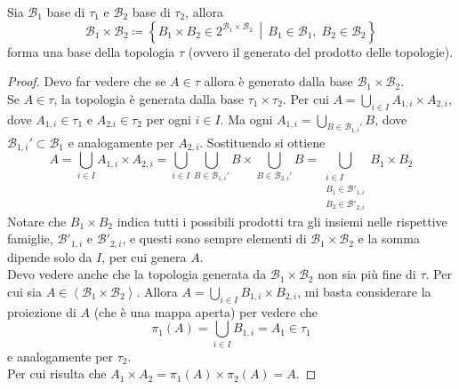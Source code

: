 \begin{theorem}
	Sia $\mathcal{B}_1$ base di $\tau_1$ e $\mathcal{B}_2$ base di $\tau_2$, allora
	\begin{equation*}
		\mathcal{B}_1 \times \mathcal{B}_2 \coloneqq \left\{B_1 \times B_2 \in 2^{\mathcal{B}_1 \times \mathcal{B}_2} \,\middle|\, B_1 \in \mathcal{B}_1, \; B_2 \in \mathcal{B}_2\right\}
	\end{equation*}
	forma una base della topologia $\tau$ (ovvero il generato del prodotto delle topologie).
\end{theorem}
\begin{proof}
	Devo far vedere che se $A \in \tau$ allora è generato dalla base $\mathcal{B}_1 \times \mathcal{B}_2$. \\ Se $A \in \tau$, la topologia è generata dalla base $\tau_1 \times \tau_2$. Per cui $A = \bigcup_{i \in I} A_{1,i} \times A_{2,i}$, dove $A_{1,i} \in \tau_1$ e $A_{2.i} \in \tau_2$ per ogni $i \in I$. Ma ogni $A_{1, i} = \bigcup_{B \in \mathcal{B}_{1,i}'} B$, dove $\mathcal{B}_{1,i}' \subset \mathcal{B}_1$ e analogamente per $A_{2,i}$. Sostituendo si ottiene
	\begin{equation*}
		A = \bigcup_{i \in I} A_{1,i} \times A_{2,i} = \bigcup_{i \in I} \bigcup_{B \in \mathcal{B}_{1,i}'} B \times \bigcup_{B \in \mathcal{B}_{2,i}'} B = \bigcup_{\substack{i \in I \\ B_1 \in \mathcal{B}'_{1,i} \\ B_2 \in \mathcal{B}'_{2,i}}} B_1 \times B_2
	\end{equation*}
	Notare che $B_1 \times B_2$ indica tutti i possibili prodotti tra gli insiemi nelle rispettive famiglie, $\mathcal{B}'_{1,i}$ e $\mathcal{B}'_{2,i}$, e questi sono sempre elementi di $\mathcal{B}_1 \times \mathcal{B}_2$ e la somma dipende solo da $I$, per cui genera $A$. \\
	
	Devo vedere anche che la topologia generata da $\mathcal{B}_1 \times \mathcal{B}_2$ non sia più fine di $\tau$. Per cui sia $A \in \left\langle \mathcal{B}_1 \times \mathcal{B}_2 \right\rangle$. Allora $A = \bigcup_{i \in I} B_{1,i} \times B_{2,i}$, mi basta considerare la proiezione di $A$ (che è una mappa aperta) per vedere che 
	\begin{equation*}
	\pi_1(A) = \bigcup_{i \in I} B_{1,i} = A_1 \in \tau_1
	\end{equation*}
	 e analogamente per $\tau_2$. \\ Per cui risulta che $A_1 \times A_2 = \pi_1(A) \times \pi_2(A) = A$.
\end{proof}


